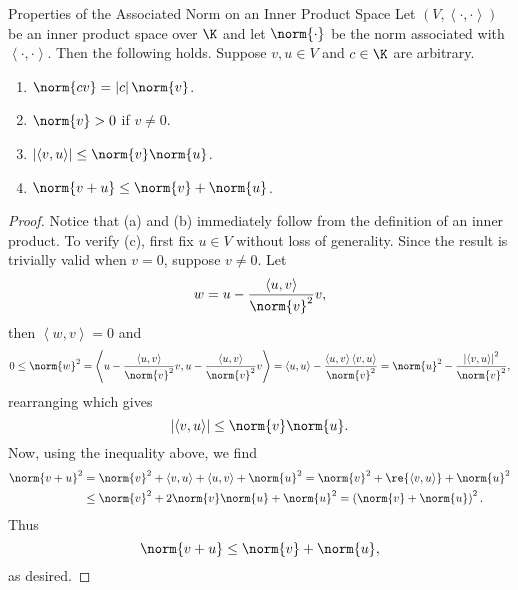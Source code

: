\documentclass[linearalgebraII]{subfiles}
\begin{document}
    \begin{theorem}{Properties of the Associated Norm on an Inner Product Space}
        Let $\left( V, \left\langle \cdot, \cdot\right\rangle  \right)$ be an inner product space over $\K$ and let $\norm{\cdot}$ be the norm associated with $\left\langle \cdot, \cdot\right\rangle$. Then the following holds. Suppose $v,u\in V$ and $c\in\K$ are arbitrary.
        \begin{enumerate}
            \item $\norm{cv} = \left| c \right|\norm{v}$.
            \item $\norm{v} > 0$ if $v\neq 0$.
            \item $\left| \left\langle v, u\right\rangle  \right| \leq \norm{v}\norm{u}$.
            \item $\norm{v+u}\leq \norm{v}+\norm{u}$.
        \end{enumerate}
    \end{theorem}

    \begin{proof}
        Notice that (a) and (b) immediately follow from the definition of an inner product. To verify (c), first fix $u\in V$ without loss of generality. Since the result is trivially valid when $v=0$, suppose $v\neq 0$. Let
        \begin{equation*}
            w = u - \frac{\left\langle u, v\right\rangle }{\norm{v}^2}v,
        \end{equation*}
        then $\left\langle w, v\right\rangle = 0$ and
        \begin{equation*}
            0\leq \norm{w}^2 = \left\langle u-\frac{\left\langle u, v\right\rangle }{\norm{v}^2}v, u-\frac{\left\langle u, v\right\rangle }{\norm{v}^2}v\right\rangle = \left\langle u, u\right\rangle - \frac{\left\langle u, v\right\rangle \left\langle v, u\right\rangle }{\norm{v}^2} = \norm{u}^2 - \frac{\left|\left\langle v, u\right\rangle\right| ^2}{\norm{v}^2},
        \end{equation*}
        rearranging which gives
        \begin{equation*}
            \left| \left\langle v, u\right\rangle  \right| \leq \norm{v}\norm{u}.
        \end{equation*}
        Now, using the inequality above, we find
        \begin{align*}
            \norm{v+u}^2 & = \norm{v}^2 + \left\langle v, u\right\rangle + \left\langle u, v\right\rangle + \norm{u}^2 = \norm{v}^2 + \re{\left\langle v, u\right\rangle } + \norm{u}^2 \\
                         & \leq \norm{v}^2 + 2\norm{v}\norm{u} + \norm{u}^2 = \left( \norm{v} + \norm{u} \right)^2.
        \end{align*} 
        Thus
        \begin{equation*}
            \norm{v+u}\leq \norm{v} + \norm{u},
        \end{equation*}
        as desired.
    \end{proof}
\end{document}
